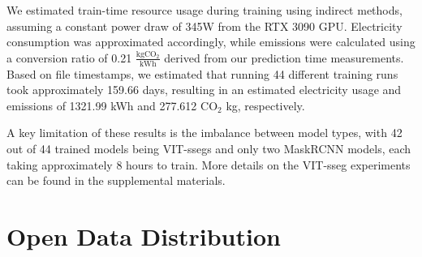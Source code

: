 \documentclass[10pt,twocolumn,letterpaper]{article}
\newcommand{\cotwo}{\ensuremath{\mathrm{CO_2}}}
\begin{document}
We estimated train-time resource usage during training using indirect methods, assuming a constant power
  draw of 345W from the RTX 3090 GPU.
Electricity consumption was approximated accordingly, while emissions were calculated using a conversion
  ratio of 0.21 $\frac{\textrm{kg}\cotwo{}}{\textrm{kWh}}$ derived from our prediction time measurements.
Based on file timestamps, we estimated that running 44 different training runs took approximately 159.66
  days, resulting in an estimated electricity usage and emissions of 1321.99 kWh and 277.612 $\cotwo$ kg,
  respectively.

A key limitation of these results is the imbalance between model types, with 42 out of 44 trained models
  being VIT-ssegs and only two MaskRCNN models, each taking approximately 8 hours to train.
More details on the VIT-sseg experiments can be found in the supplemental materials.
  








\section{Open Data Distribution}
\label{sec:distribution}

  
\end{document}

